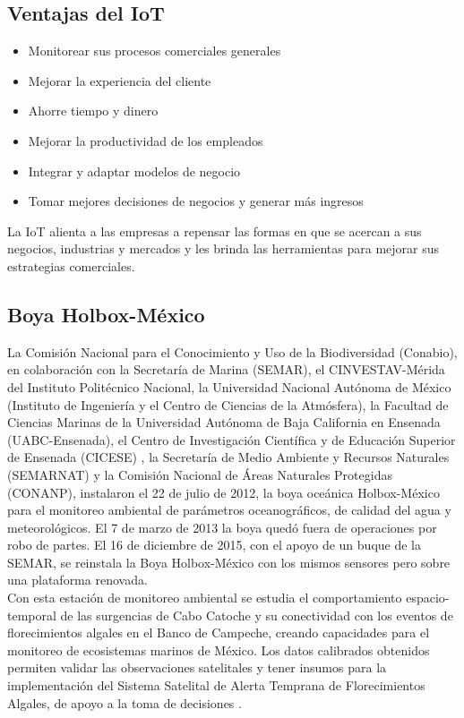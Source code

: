 \documentclass[12pt]{book}
\begin{document}
\subsection{Ventajas del IoT}
\begin{itemize}
	\item Monitorear sus procesos comerciales generales
	\item Mejorar la experiencia del cliente
	\item Ahorre tiempo y dinero
	\item Mejorar la productividad de los empleados
	\item Integrar y adaptar modelos de negocio
	\item Tomar mejores decisiones de negocios y
	generar más ingresos
\end{itemize}
La IoT alienta a las empresas a repensar las formas en que se acercan a sus negocios, industrias y mercados y les brinda las herramientas para mejorar sus estrategias comerciales.

\subsection{Boya Holbox-México}
La Comisión Nacional para el Conocimiento y Uso de la Biodiversidad (Conabio), en colaboración con la Secretaría de Marina (SEMAR), el CINVESTAV-Mérida del Instituto Politécnico Nacional, la Universidad Nacional Autónoma de México (Instituto de Ingeniería y el Centro de Ciencias de la Atmósfera), la Facultad de Ciencias Marinas de la Universidad Autónoma de Baja California en Ensenada (UABC-Ensenada), el Centro de Investigación Científica y de Educación Superior de Ensenada (CICESE) , la Secretaría de Medio Ambiente y Recursos Naturales (SEMARNAT) y la Comisión Nacional de Áreas Naturales Protegidas (CONANP), instalaron el 22 de julio de 2012, la boya oceánica Holbox-México para el monitoreo ambiental de parámetros oceanográficos, de calidad del agua y meteorológicos. El 7 de marzo de 2013 la boya quedó fuera de operaciones por robo de partes. El 16 de diciembre de 2015, con el apoyo de un buque de la SEMAR, se reinstala la Boya Holbox-México con los mismos sensores pero sobre una plataforma renovada. \\
Con esta estación de monitoreo ambiental se estudia el comportamiento espacio-temporal de las surgencias de Cabo Catoche y su conectividad con los eventos de florecimientos algales en el Banco de Campeche, creando capacidades para el monitoreo de ecosistemas marinos de México. Los datos calibrados obtenidos permiten validar las observaciones satelitales y tener insumos para la implementación del Sistema Satelital de Alerta Temprana de Florecimientos Algales, de apoyo a la toma de decisiones \cite{holbox}.
\end{document}
